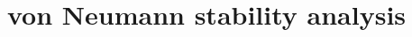 \documentclass[12pt]{article}
\begin{document}
\section{von Neumann stability analysis}
\end{document}
